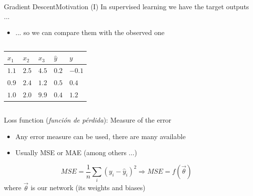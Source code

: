 \documentclass[10pt,compress]{beamer} %
\begin{document}
\begin{frame}{Gradient Descent}{Motivation (I)}
    In supervised learning we have the target outputs ...
	\begin{itemize}
	\item ... so we can compare them with the observed one
	\end{itemize}

	\begin{columns}[c]
            

            \begin{table}[]
            \centering
            \begin{tabular}{lll|l|l}\hline
		    $x_1$ & $x_2$ & $x_3$ & $\hat{y}$ & $y$ \\
               \hline
              $1.1$ & $2.5$ & $4.5$ & $0.2$ & $-0.1$   \\
              $0.9$ & $2.4$ & $1.2$ & $0.5$ & $0.4$  \\
              $1.0$ & $2.0$ & $9.9$ & $0.4$ & $1.2$ \\\hline
            \end{tabular}
	    \end{table}
    \end{columns}

	\alert{Loss function} (\textit{función de pérdida}): Measure of the error
        \begin{itemize}
		\item Any error measure can be used, there are many available
		\item Usually MSE or MAE (among others ...)
        \end{itemize}

	\begin{equation*}
		MSE = \frac{1}{n} \sum_i(y_i-\hat{y}_i)^2 \Rightarrow MSE = f(\vec{\theta})
	\end{equation*}
	where $\vec{\theta}$ is our network (its weights and biases)
\end{frame}
\end{document}
